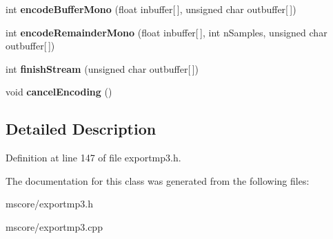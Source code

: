 \begin{DoxyCompactItemize}
\mbox{\label{class_ms_1_1_m_p3_exporter_a8aaf92649bfa9a7c22951264aad2a2a8}} 
int {\bfseries encode\+Buffer\+Mono} (float inbuffer\mbox{[}$\,$\mbox{]}, unsigned char outbuffer\mbox{[}$\,$\mbox{]})
\item 
\mbox{\label{class_ms_1_1_m_p3_exporter_ac51c06c4d4a313b551c07e3594281cb3}} 
int {\bfseries encode\+Remainder\+Mono} (float inbuffer\mbox{[}$\,$\mbox{]}, int n\+Samples, unsigned char outbuffer\mbox{[}$\,$\mbox{]})
\item 
\mbox{\label{class_ms_1_1_m_p3_exporter_a693b6cd1b91e73f574920998397deaca}} 
int {\bfseries finish\+Stream} (unsigned char outbuffer\mbox{[}$\,$\mbox{]})
\item 
\mbox{\label{class_ms_1_1_m_p3_exporter_a0269043eb1689134b34594c326103b24}} 
void {\bfseries cancel\+Encoding} ()
\end{DoxyCompactItemize}


\subsection{Detailed Description}


Definition at line 147 of file exportmp3.\+h.



The documentation for this class was generated from the following files\+:\begin{DoxyCompactItemize}
\item 
mscore/exportmp3.\+h\item 
mscore/exportmp3.\+cpp\end{DoxyCompactItemize}
